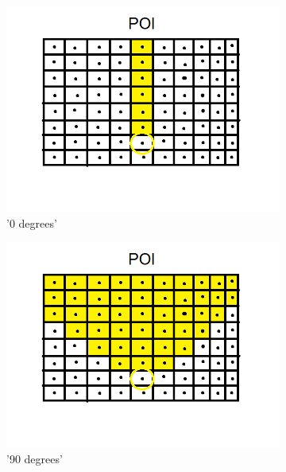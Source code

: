 \begin{figure}[h]
  \centering
  \begin{subfigure}[b]{0.3\linewidth}
    \includegraphics[width=\linewidth]{images/chapter4/0deg.png}
    \caption{'0 degrees'}
  \end{subfigure}
  \begin{subfigure}[b]{0.3\linewidth}
    \includegraphics[width=\linewidth]{images/chapter4/90deg.png}
    \caption{'90 degrees'}
  \end{subfigure}
    \begin{subfigure}[b]{0.3\linewidth}

\end{subfigure}
\end{figure}
